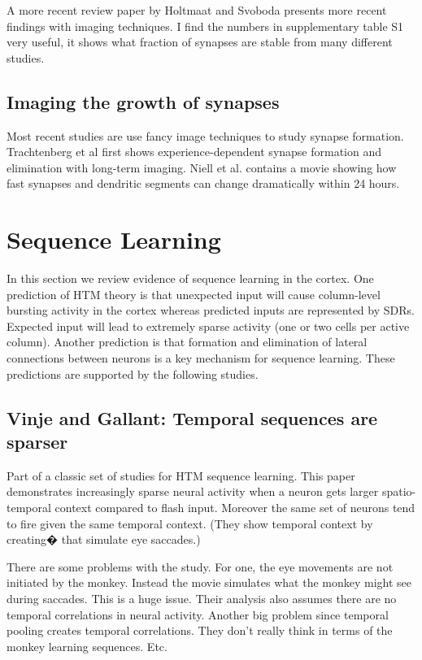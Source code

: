 \documentclass{article} %
\begin{document}
A more recent review paper by Holtmaat and Svoboda \cite{Holtmaat2009} presents
more recent findings with imaging techniques. I find the numbers in
supplementary table S1 very useful, it shows what fraction of synapses are
stable from many different studies.

\subsection{Imaging the growth of synapses}

Most recent studies are use fancy image techniques to study synapse formation.
Trachtenberg et al \cite{Trachtenberg2002} first shows experience-dependent
synapse formation and elimination with long-term imaging. Niell et al.
\cite{Niell2004} contains a movie showing how fast synapses and dendritic
segments can change dramatically within 24 hours.

\section{Sequence Learning}

In this section we review evidence of sequence learning in the cortex. One
prediction of HTM theory is that unexpected input will cause  column-level
bursting  activity in the cortex whereas predicted inputs are represented by
SDRs. Expected input will lead to extremely sparse activity (one or two cells
per active column). Another prediction is that formation and elimination of
lateral connections between neurons is a key mechanism for sequence
learning. These predictions are supported by the following studies.

\subsection{Vinje and Gallant: Temporal sequences are sparser}

Part of a classic set of studies for HTM sequence learning. This paper
\cite{Vinje2002}
demonstrates increasingly sparse neural activity when a neuron gets larger
spatio-temporal context compared to flash input. Moreover the same set of
neurons tend to fire given the same temporal context. (They show temporal
context by creating� that simulate eye saccades.)

There are some problems with the study. For one, the eye movements are not
initiated by the monkey. Instead the movie simulates what the monkey might see
during saccades. This is a huge issue. Their analysis also assumes there are no
temporal correlations in neural activity. Another big problem since temporal
pooling creates temporal correlations. They don't really think in terms of the
monkey learning sequences. Etc.
\end{document}
